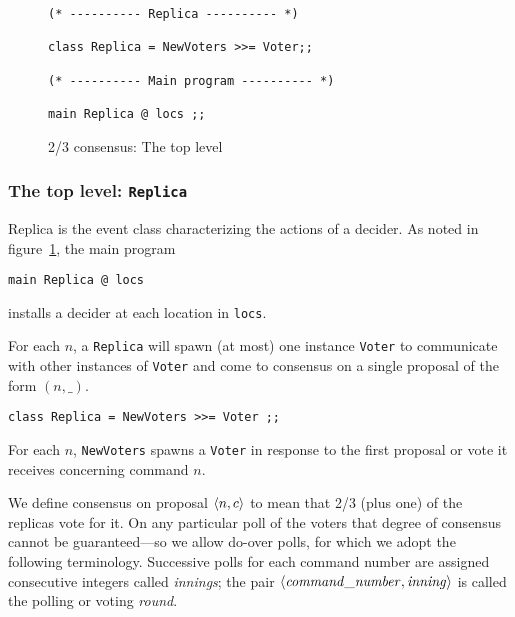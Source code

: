 \documentclass[final]{article}
\begin{document}
\begin{figure}[!t]
  \begin{lstlisting}[basicstyle=\small]
(* ---------- Replica ---------- *)

class Replica = NewVoters >>= Voter;;

(* ---------- Main program ---------- *)

main Replica @ locs ;;
  \end{lstlisting}
  \caption{2/3 consensus: The top level}
  \label{fig:simple-consensus-top-level}
\end{figure}




\subsubsection{The top level:
  \lstinline{Replica}}\label{sec:simple-consensus-top-level}

Replica is the event class characterizing the actions of a decider.
As noted in figure~\ref{fig:simple-consensus-top-level}, the main
program
\begin{emlcode}
\begin{lstlisting}
main Replica @ locs
\end{lstlisting}
\end{emlcode}
installs a decider at each location in \lstinline{locs}.

For each $n$, a \lstinline{Replica} will spawn (at most) one instance
\lstinline{Voter} to communicate with other instances of
\lstinline{Voter} and come to consensus on a single proposal of the
form $(n,\_)$.
\begin{emlcode}
\begin{lstlisting}
class Replica = NewVoters >>= Voter ;;
\end{lstlisting}
\end{emlcode}
For each $n$, \lstinline{NewVoters} spawns a \lstinline{Voter} in
response to the first proposal or vote it receives concerning command
$n$.

We define consensus on proposal $\langle n,c\rangle$ to mean that 2/3
(plus one) of the replicas vote for it.  On any particular poll of the
voters that degree of consensus cannot be guaranteed---so we allow
do-over polls, for which we adopt the following terminology.
Successive polls for each command number are assigned consecutive
integers called \emph{innings}; the pair
$\langle\mathit{command\_number},\mathit{inning}\rangle$ is called the
polling or voting \emph{round}.
\end{document}
